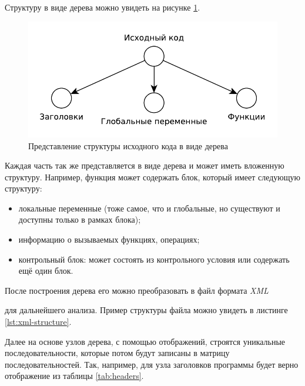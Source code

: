 Структуру в виде дерева можно увидеть на рисунке \ref{fig:structure}.

\begin{figure}[h!btp]
	\centering
	\includegraphics[width=\textwidth]{inc/structure.pdf}
	\caption{Представление структуры исходного кода в виде дерева}
	\label{fig:structure}	
\end{figure}


Каждая часть так же представляется в виде дерева и может иметь вложенную структуру. Например, функция может содержать блок, который имеет следующую структуру:
\begin{itemize}
	\item локальные переменные (тоже самое, что и глобальные, но существуют и доступны только в рамках блока);
	\item информацию о вызываемых функциях, операциях;
	\item контрольный блок: может состоять из контрольного условия или содержать ещё один блок.
\end{itemize}

После построения дерева его можно преобразовать в файл формата \textit{XML}

\noindent\cite{xml} для дальнейшего анализа. Пример структуры файла можно увидеть в листинге \ref{lst:xml-structure}.


Далее на основе узлов дерева, с помощью отображений, строятся уникальные последовательности, которые потом будут записаны в матрицу последовательностей. Так, например, для узла заголовков программы будет верно отображение из таблицы \ref{tab:headers}.

